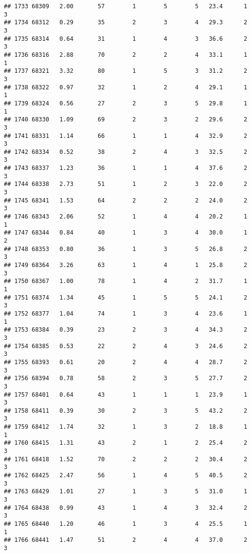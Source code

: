\documentclass[
]{article}
\begin{document}
\begin{verbatim}
## 1733 68309   2.00       57        1        5        5   23.4      1      3
## 1734 68312   0.29       35        2        3        4   29.3      2      3
## 1735 68314   0.64       31        1        4        3   36.6      2      3
## 1736 68316   2.88       70        2        2        4   33.1      1      1
## 1737 68321   3.32       80        1        5        3   31.2      2      3
## 1738 68322   0.97       32        1        2        4   29.1      1      1
## 1739 68324   0.56       27        2        3        5   29.8      1      1
## 1740 68330   1.09       69        2        3        2   29.6      2      3
## 1741 68331   1.14       66        1        1        4   32.9      2      3
## 1742 68334   0.52       38        2        4        3   32.5      2      3
## 1743 68337   1.23       36        1        1        4   37.6      2      3
## 1744 68338   2.73       51        1        2        3   22.0      2      3
## 1745 68341   1.53       64        2        2        2   24.0      2      3
## 1746 68343   2.06       52        1        4        4   20.2      1      1
## 1747 68344   0.84       40        1        3        4   30.0      1      2
## 1748 68353   0.80       36        1        3        5   26.8      2      3
## 1749 68364   3.26       63        1        4        1   25.8      2      3
## 1750 68367   1.00       78        1        4        2   31.7      1      1
## 1751 68374   1.34       45        1        5        5   24.1      2      3
## 1752 68377   1.04       74        1        3        4   23.6      1      1
## 1753 68384   0.39       23        2        3        4   34.3      2      3
## 1754 68385   0.53       22        2        4        3   24.6      2      3
## 1755 68393   0.61       20        2        4        4   28.7      2      3
## 1756 68394   0.78       58        2        3        5   27.7      2      3
## 1757 68401   0.64       43        1        1        1   23.9      1      3
## 1758 68411   0.39       30        2        3        5   43.2      2      3
## 1759 68412   1.74       32        1        3        2   18.8      1      1
## 1760 68415   1.31       43        2        1        2   25.4      2      3
## 1761 68418   1.52       70        2        2        2   30.4      2      3
## 1762 68425   2.47       56        1        4        5   40.5      2      3
## 1763 68429   1.01       27        1        3        5   31.0      1      3
## 1764 68438   0.99       43        1        4        3   32.4      2      3
## 1765 68440   1.20       46        1        3        4   25.5      1      1
## 1766 68441   1.47       51        2        4        4   37.0      2      3

\end{verbatim}
\end{document}
